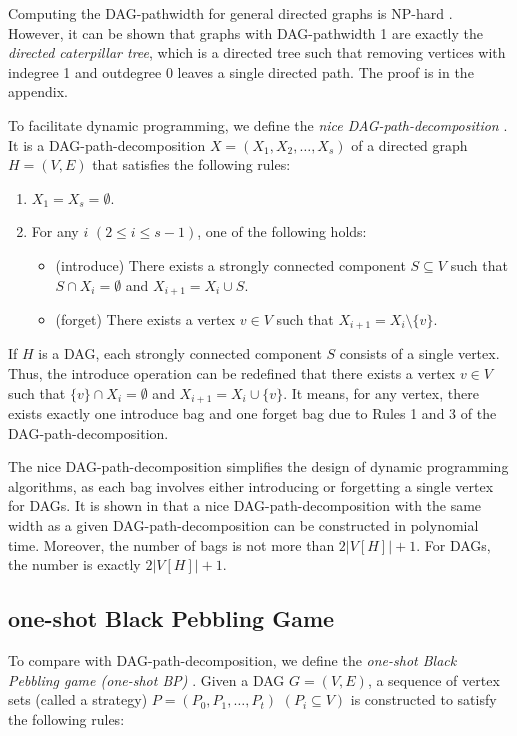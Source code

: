 \documentclass[runningheads]{llncs}
\theoremstyle{plain}
\theoremstyle{definition}
\begin{document}
Computing the DAG-pathwidth for general directed graphs is NP-hard \cite{art12}. However, it can be shown that graphs with DAG-pathwidth 1 are exactly the \emph{directed caterpillar tree}, which is a directed tree such that removing vertices with indegree 1 and outdegree 0 leaves a single directed path. The proof is in the appendix.

To facilitate dynamic programming, we define the \emph{nice DAG-path-decomposition} \cite{art12}. It is a DAG-path-decomposition $X = (X_1, X_2, \dots, X_s)$ of a directed graph $H = (V, E)$ that satisfies the following rules:
\begin{enumerate}
    \item $X_1 = X_s = \emptyset$.
    \item For any $i$ $(2 \leq i \leq s - 1)$, one of the following holds:
    \begin{itemize}
        \item (introduce) There exists a strongly connected component $S \subseteq V$ such that $S \cap X_i = \emptyset$ and $X_{i+1} = X_i \cup S$.
        \item (forget) There exists a vertex $v \in V$ such that $X_{i+1} = X_i \setminus \{v\}$.
    \end{itemize}
\end{enumerate}

If $H$ is a DAG, each strongly connected component $S$ consists of a single vertex. Thus, the introduce operation can be redefined that there exists a vertex $v \in V$ such that $\{v\} \cap X_i = \emptyset$ and $X_{i+1} = X_i \cup \{v\}$. It means, for any vertex, there exists exactly one introduce bag and one forget bag due to Rules 1 and 3 of the DAG-path-decomposition.

The nice DAG-path-decomposition simplifies the design of dynamic programming algorithms, as each bag involves either introducing or forgetting a single vertex for DAGs. It is shown in \cite{art12} that a nice DAG-path-decomposition with the same width as a given DAG-path-decomposition can be constructed in polynomial time. Moreover, the number of bags is not more than $2|V[H]| + 1$. For DAGs, the number is exactly $2|V[H]| + 1$.



\subsection{one-shot Black Pebbling Game} %
To compare with DAG-path-decomposition, we define the \emph{one-shot Black Pebbling game (one-shot BP)} \cite{art13}. Given a DAG $G = (V, E)$, a sequence of vertex sets (called a strategy) $P = (P_0, P_1, \dots, P_t)$ $(P_i \subseteq V)$ is constructed to satisfy the following rules:
\end{document}
